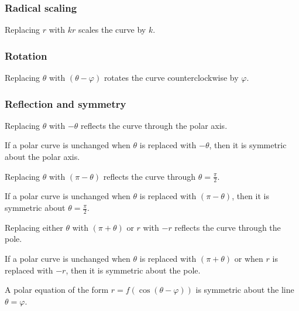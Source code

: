 \subsubsection{Radical scaling}
Replacing $r$ with $kr$ scales the curve by $k$.
\subsubsection{Rotation}
Replacing $\theta$ with $(\theta-\varphi)$ rotates the curve counterclockwise by $\varphi$.
\subsubsection{Reflection and symmetry}
Replacing $\theta$ with $-\theta$ reflects the curve through the polar axis.

If a polar curve is unchanged when $\theta$ is replaced with $-\theta$, then it is symmetric about the polar axis.

Replacing $\theta$ with $(\pi-\theta)$ reflects the curve through $\theta=\frac{\pi}{2}$.

If a polar curve is unchanged when $\theta$ is replaced with $(\pi-\theta)$, then it is symmetric about $\theta=\frac{\pi}{2}$.

Replacing either $\theta$ with $(\pi+\theta)$ or $r$ with $-r$ reflects the curve through the pole.

If a polar curve is unchanged when $\theta$ is replaced with $(\pi+\theta)$ or when $r$ is replaced with $-r$, then it is symmetric about the pole.

A polar equation of the form $r=f(\cos(\theta-\varphi))$ is symmetric about the line $\theta=\varphi$.
